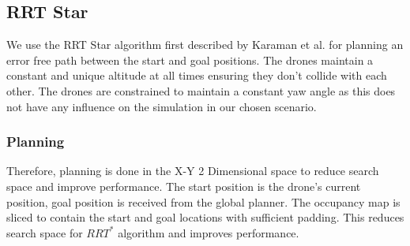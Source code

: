 \subsection{RRT Star}
We use the RRT Star algorithm first described by Karaman et al.\cite{karaman2011sampling} for planning an error free path between the start and goal positions.
The drones maintain a constant and unique altitude at all times ensuring they don't collide with each other.
The drones are constrained to maintain a constant yaw angle as this does not have any influence on the simulation in our chosen scenario.
\subsubsection{Planning}
Therefore, planning is done in the X-Y 2 Dimensional space to reduce search space and improve performance.
The start position is the drone's current position, goal position is received from the global planner.
The occupancy map is sliced to contain the start and goal locations with sufficient padding.
This reduces search space for $RRT^*$ algorithm and improves performance.

